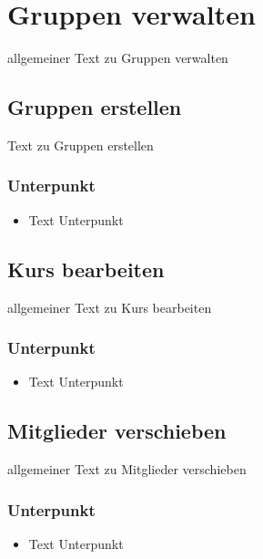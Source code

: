 \chapter{Gruppen verwalten}\label{gruppenfilter}
\minitoc
allgemeiner Text zu Gruppen verwalten

\section{Gruppen erstellen}
Text zu Gruppen erstellen
\subsection*{Unterpunkt}
\begin{itemize}
	\item Text Unterpunkt
\end{itemize}

\clearpage

\section{Kurs bearbeiten}
allgemeiner Text zu Kurs bearbeiten
\subsection*{Unterpunkt}
\begin{itemize}
	\item Text Unterpunkt
\end{itemize}

\clearpage

\section{Mitglieder verschieben}
allgemeiner Text zu Mitglieder verschieben
\subsection*{Unterpunkt}
\begin{itemize}
	\item Text Unterpunkt
\end{itemize}

\clearpage